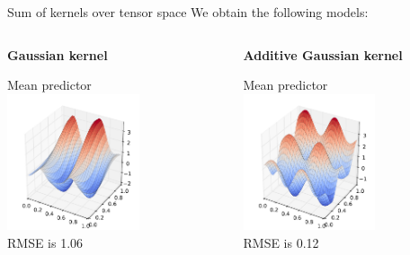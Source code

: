\documentclass{beamer}
\begin{document}
\begin{frame}{Sum of kernels over tensor space}
We obtain the following models:\\ \vspace{5mm}
\begin{columns}[c]
\begin{column}{5cm}
\textbf{Gaussian kernel}
\begin{center}
Mean predictor
\includegraphics[height=4cm]{figures/python/newfromold-productvssum2-predp}\\
RMSE is 1.06
\end{center}
\end{column}
\begin{column}{5cm}
\textbf{Additive Gaussian kernel}
\begin{center}
Mean predictor
\includegraphics[height=4cm]{figures/python/newfromold-productvssum2-preda}\\
RMSE is 0.12
\end{center}
\end{column}
\end{columns} 
\end{frame}
\end{document}
